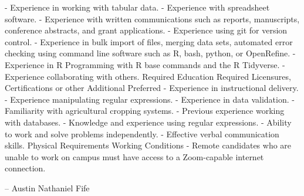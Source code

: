 \documentclass[11pt]{letter} %
\begin{document}
\begin{letter}

- Experience in working with tabular data. 
- Experience with spreadsheet software.
- Experience with written communications such as reports, manuscripts, conference abstracts, and grant applications.
- Experience using git for version control.
- Experience in bulk import of files, merging data sets, automated error checking using command line software such as R, bash, python, or OpenRefine.
- Experience in R Programming with R base commands and the R Tidyverse.
- Experience collaborating with others.
Required Education	
Required Licensures, Certifications or other	
Additional Preferred	
- Experience in instructional delivery.
- Experience manipulating regular expressions.
- Experience in data validation.
- Familiarity with agricultural cropping systems.
- Previous experience working with databases.
- Knowledge and experience using regular expressions.
- Ability to work and solve problems independently.
- Effective verbal communication skills.
Physical Requirements	
Working Conditions	
- Remote candidates who are unable to work on campus must have access to a Zoom-capable internet connection.


\quad -- Austin Nathaniel Fife

\thispagestyle{empty}

\end{letter}
\end{document}
